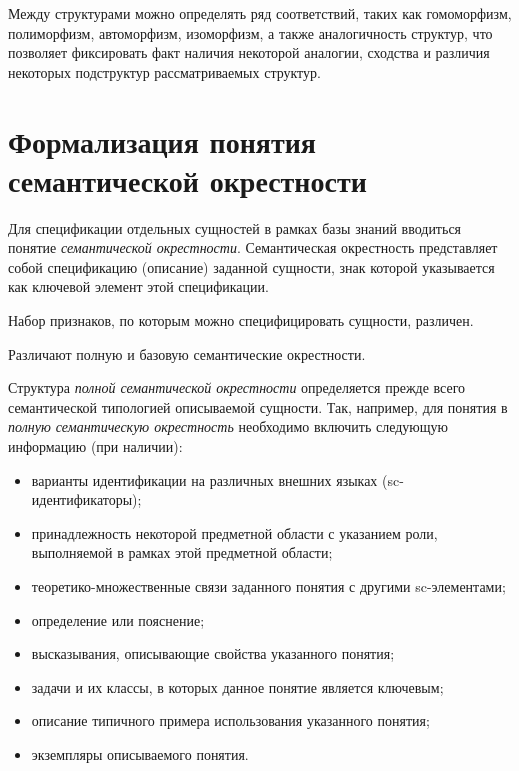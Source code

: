 Между структурами можно определять ряд соответствий, таких как гомоморфизм, полиморфизм, автоморфизм, изоморфизм, а также аналогичность структур, что позволяет фиксировать факт наличия некоторой аналогии, сходства и различия некоторых подструктур рассматриваемых структур.



\section{Формализация понятия семантической окрестности}

Для спецификации отдельных сущностей в рамках базы знаний вводиться понятие \textit{семантической окрестности}. Семантическая окрестность представляет собой спецификацию (описание) заданной сущности, знак которой указывается как ключевой элемент этой спецификации.

Набор признаков, по которым можно специфицировать сущности, различен.

Различают полную и базовую семантические окрестности.

\begin{SCn}
\end{SCn}

Структура \textit{полной семантической окрестности} определяется прежде всего семантической типологией описываемой сущности.
Так, например, для понятия в \textit{полную семантическую окрестность} необходимо включить следующую
информацию (при наличии):
\begin{itemize}
	\item{варианты идентификации на различных внешних языках (sc-идентификаторы)};
	\item{принадлежность некоторой предметной области с указанием роли, выполняемой в рамках этой предметной области};
	\item{теоретико-множественные связи заданного понятия с другими sc-элементами};
	\item{определение или пояснение};
	\item{высказывания, описывающие свойства указанного понятия};
	\item{задачи и их классы, в которых данное понятие является ключевым};
	\item{описание типичного примера использования указанного понятия};
	\item{экземпляры описываемого понятия}.
\end{itemize}

